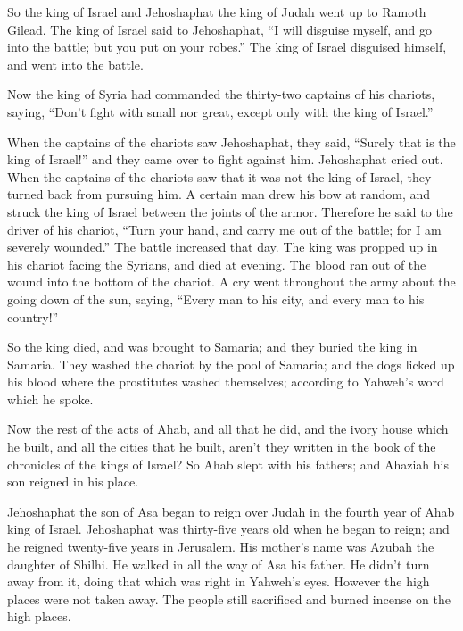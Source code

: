 {\par }{\PP {}So the king of Israel and Jehoshaphat the king of Judah went up to Ramoth Gilead.
The king of Israel said to Jehoshaphat, “I will disguise myself, and go into the battle; but you put on your robes.” The king of Israel disguised himself, and went into the battle.
\par }{\PP {}Now the king of Syria had commanded the thirty-two captains of his chariots, saying, “Don’t fight with small nor great, except only with the king of Israel.”
\par }{\PP {}When the captains of the chariots saw Jehoshaphat, they said, “Surely that is the king of Israel!” and they came over to fight against him. Jehoshaphat cried out.
When the captains of the chariots saw that it was not the king of Israel, they turned back from pursuing him.
A certain man drew his bow at random, and struck the king of Israel between the joints of the armor. Therefore he said to the driver of his chariot, “Turn your hand, and carry me out of the battle; for I am severely wounded.”
The battle increased that day. The king was propped up in his chariot facing the Syrians, and died at evening. The blood ran out of the wound into the bottom of the chariot.
A cry went throughout the army about the going down of the sun, saying, “Every man to his city, and every man to his country!”
\par }{\PP {}So the king died, and was brought to Samaria; and they buried the king in Samaria.
They washed the chariot by the pool of Samaria; and the dogs licked up his blood where the prostitutes washed themselves; according to Yahweh’s word which he spoke.
\par }{\PP {}Now the rest of the acts of Ahab, and all that he did, and the ivory house which he built, and all the cities that he built, aren’t they written in the book of the chronicles of the kings of Israel?
So Ahab slept with his fathers; and Ahaziah his son reigned in his place.
\par }{\PP {}Jehoshaphat the son of Asa began to reign over Judah in the fourth year of Ahab king of Israel.
Jehoshaphat was thirty-five years old when he began to reign; and he reigned twenty-five years in Jerusalem. His mother’s name was Azubah the daughter of Shilhi.
He walked in all the way of Asa his father. He didn’t turn away from it, doing that which was right in Yahweh’s eyes. However the high places were not taken away. The people still sacrificed and burned incense on the high places.
}

